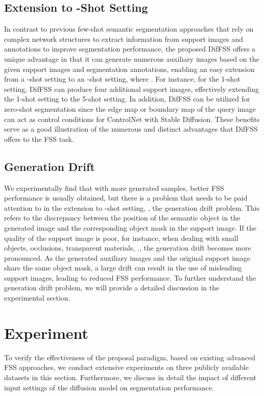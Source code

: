 \documentclass[sigconf]{acmart}
\begin{document}
\subsection{Extension to -Shot Setting}
In contrast to previous few-shot semantic segmentation approaches that rely on complex network structures to extract information from support images and annotations to improve segmentation performance, the proposed DifFSS offers a unique advantage in that it can generate numerous auxiliary images based on the given support images and segmentation annotations, enabling an easy extension from a -shot setting to an -shot setting, where . For instance, for the 1-shot setting, DifFSS can produce four additional support images, effectively extending the 1-shot setting to the 5-shot setting. In addition, DifFSS can be utilized for zero-shot segmentation since the edge map or boundary map of the query image can act as control conditions for ControlNet with Stable Diffusion. These benefits serve as a good illustration of the numerous and distinct advantages that DifFSS offers to the FSS task.


\subsection{Generation Drift}
We experimentally find that with more generated samples, better FSS performance is usually obtained, but there is a problem that needs to be paid attention to in the extension to -shot setting, , the generation drift problem. This refers to the discrepancy between the position of the semantic object in the generated image and the corresponding object mask in the support image. If the quality of the support image is poor, for instance, when dealing with small objects, occlusions, transparent materials, ., the generation drift becomes more pronounced. As the generated auxiliary images and the original support image share the same object mask, a large drift can result in the use of misleading support images, leading to reduced FSS performance. To further understand the generation drift problem, we will provide a detailed discussion in the experimental section.



\section{Experiment}
To verify the effectiveness of the proposal paradigm, based on existing advanced FSS approaches, we conduct extensive experiments on three publicly available datasets in this section. Furthermore, we discuss in detail the impact of different input settings of the diffusion model on segmentation performance.
\end{document}
